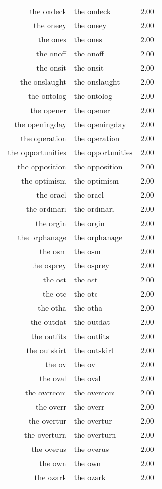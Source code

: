 \begin{table}[ht]
\begin{tabular}{rlr}
  the ondeck & the ondeck & 2.00 \\ 
  the oneey & the oneey & 2.00 \\ 
  the ones & the ones & 2.00 \\ 
  the onoff & the onoff & 2.00 \\ 
  the onsit & the onsit & 2.00 \\ 
  the onslaught & the onslaught & 2.00 \\ 
  the ontolog & the ontolog & 2.00 \\ 
  the opener & the opener & 2.00 \\ 
  the openingday & the openingday & 2.00 \\ 
  the operation & the operation & 2.00 \\ 
  the opportunities & the opportunities & 2.00 \\ 
  the opposition & the opposition & 2.00 \\ 
  the optimism & the optimism & 2.00 \\ 
  the oracl & the oracl & 2.00 \\ 
  the ordinari & the ordinari & 2.00 \\ 
  the orgin & the orgin & 2.00 \\ 
  the orphanage & the orphanage & 2.00 \\ 
  the osm & the osm & 2.00 \\ 
  the osprey & the osprey & 2.00 \\ 
  the ost & the ost & 2.00 \\ 
  the otc & the otc & 2.00 \\ 
  the otha & the otha & 2.00 \\ 
  the outdat & the outdat & 2.00 \\ 
  the outfits & the outfits & 2.00 \\ 
  the outskirt & the outskirt & 2.00 \\ 
  the ov & the ov & 2.00 \\ 
  the oval & the oval & 2.00 \\ 
  the overcom & the overcom & 2.00 \\ 
  the overr & the overr & 2.00 \\ 
  the overtur & the overtur & 2.00 \\ 
  the overturn & the overturn & 2.00 \\ 
  the overus & the overus & 2.00 \\ 
  the own & the own & 2.00 \\ 
  the ozark & the ozark & 2.00 \\ 

\end{tabular}
\end{table}
